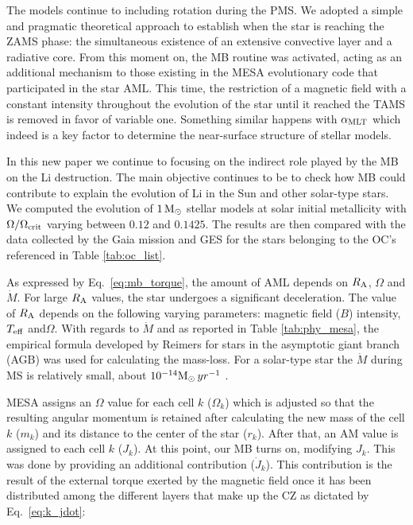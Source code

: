 \documentclass[fleqn,usenatbib]{mnras}
\begin{document}
\begin{ceqn}
The models continue to including rotation during the PMS. We adopted a simple and pragmatic theoretical approach to establish when the star is reaching the ZAMS phase: the simultaneous existence of an extensive convective layer and a radiative core. From this moment on, the MB routine was activated, acting as an additional mechanism to those existing in the MESA evolutionary code that participated in the star AML. This time, the restriction of a magnetic field with a constant intensity throughout the evolution of the star until it reached the TAMS is removed in favor of variable one. Something similar happens with $\alpha_{\mathrm{MLT}}$ which indeed is  a key factor to determine the near-surface structure of stellar models. 

In this new paper we continue to focusing on the indirect role played by the MB on the Li destruction. The main objective continues to be to check how MB could contribute to explain the evolution of Li in the Sun and other solar-type stars. We computed the evolution of $1\,\mathrm{M}_\odot$ stellar models at solar initial metallicity with $\Omega / \Omega_{\mathrm{crit}}$ varying between $0.12$ and $0.1425$. The results are then compared with the data collected by the Gaia mission and GES for the stars belonging to the OC's referenced in Table \ref{tab:oc_list}.\par


As expressed by Eq.~\ref{eq:mb_torque}, the amount of AML depends on $R_{\mathrm{A}}$, $\Omega$ and $\Dot{M}$. For large $R_{\mathrm{A}}$ values, the star undergoes a significant deceleration. The value of $R_{\mathrm{A}}$ depends on the following varying parameters: magnetic field ($B$) intensity, $T_{\mathrm{eff}}$ and$\Omega$. With regards to $\Dot{M}$ and as reported in Table \ref{tab:phy_mesa}, the empirical formula developed by Reimers \citep{Reimers1975} for stars in the asymptotic giant branch (AGB) was used for calculating the mass-loss. For a solar-type star the $\Dot{M}$ during MS is relatively small, about  $10^{-14}\mathrm{M}_\odot \, yr^{-1}$ \citep{Noerdlinger2008}. \par

MESA assigns an $\Omega$ value for each cell $k$ ($\Omega_k$) which is adjusted so that the resulting angular momentum is retained after calculating the new mass of the cell $k$ ($m_k$) and its distance to the center of the star ($r_k$). After that, an AM value is assigned to each cell $k$ ($J_k$). At this point, our MB turns on, modifying $J_k$. This was done by providing an additional contribution ($\Dot{J}_{k}$). This contribution is the result of the external torque exerted by the magnetic field once it has been distributed among the different layers that make up the CZ as dictated by Eq.~\ref{eq:k_jdot}:\par
 

\end{ceqn}
\end{document}

